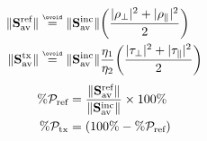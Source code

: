 \begin{myframe}
    $$
        \begin{aligned}
            \norm{\mathbf{S}^{\text{ref}}_{\text{av}}} 
            &\overset{\underset{\ovoid}{}}{=} 
            \norm{\mathbf{S}^{\text{inc}}_{\text{av}}} \left(\frac{\abs{\rho_{\perp}}^2 + \abs{\rho_{\parallel}}^2}{2}\right)
            \\
            \norm{\mathbf{S}^{\text{tx}}_{\text{av}}} 
            &\overset{\underset{\ovoid}{}}{=}  
            \norm{\mathbf{S}^{\text{inc}}_{\text{av}} }\frac{\eta_1}{\eta_2}\left(\frac{\abs{\tau_{\perp}}^2 + \abs{\tau_{\parallel}}^2}{2}\right)
        \end{aligned}
    $$
    $$
        \begin{aligned}
        \% \mathcal{P}_{\text{ref}} &= \frac{\lVert\mathbf{S}^{\text{ref}}_{\text{av}}\rVert}{\lVert\mathbf{S}^{\text{inc}}_{\text{av}}\rVert} \times 100\%
        \\
        \% \mathcal{P}_{\text{tx}} &= (100\% - \% \mathcal{P}_{\text{ref}})
        \end{aligned}
    $$
\end{myframe}
